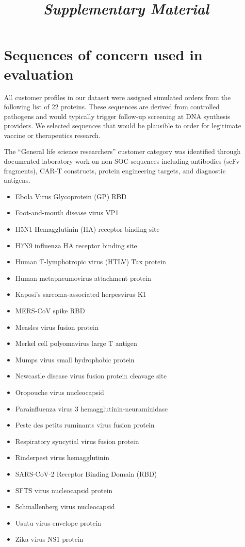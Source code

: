 \documentclass[12pt]{article}
\begin{document}
\title{\textit{Supplementary Material}}
\author{}
\date{}
\maketitle

\section{Sequences of concern used in evaluation}

All customer profiles in our dataset were assigned simulated orders from the following list of 22 proteins. These sequences are derived from controlled pathogens and would typically trigger follow-up screening at DNA synthesis providers. We selected sequences that would be plausible to order for legitimate vaccine or therapeutics research.

The ``General life science researchers'' customer category was identified through documented laboratory work on non-SOC sequences including antibodies (scFv fragments), CAR-T constructs, protein engineering targets, and diagnostic antigens.

\begin{itemize}
\item Ebola Virus Glycoprotein (GP) RBD
\item Foot-and-mouth disease virus VP1
\item H5N1 Hemagglutinin (HA) receptor-binding site
\item H7N9 influenza HA receptor binding site
\item Human T-lymphotropic virus (HTLV) Tax protein
\item Human metapneumovirus attachment protein
\item Kaposi's sarcoma-associated herpesvirus K1
\item MERS-CoV spike RBD
\item Measles virus fusion protein
\item Merkel cell polyomavirus large T antigen
\item Mumps virus small hydrophobic protein
\item Newcastle disease virus fusion protein cleavage site
\item Oropouche virus nucleocapsid
\item Parainfluenza virus 3 hemagglutinin-neuraminidase
\item Peste des petits ruminants virus fusion protein
\item Respiratory syncytial virus fusion protein
\item Rinderpest virus hemagglutinin
\item SARS-CoV-2 Receptor Binding Domain (RBD)
\item SFTS virus nucleocapsid protein
\item Schmallenberg virus nucleocapsid
\item Usutu virus envelope protein
\item Zika virus NS1 protein
\end{itemize}
\end{document}
